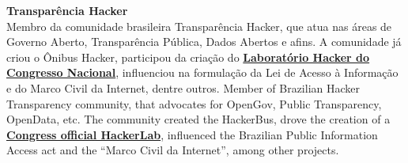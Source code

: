 \documentclass[]{friggeri-cv}
\begin{document}
\textbf{Transparência Hacker }\\
%
{Membro da comunidade brasileira Transparência Hacker, que atua nas áreas de Governo Aberto, Transparência Pública, Dados Abertos e afins. A comunidade já criou o Ônibus Hacker, participou da criação do \href{https://blog.openingparliament.org/post/72099651071/a-permanent-hacker-space-in-the-brazilian-congress}{\textbf{Laboratório Hacker do Congresso Nacional}}, influenciou na formulação da Lei de Acesso à Informação e do Marco Civil da Internet, dentre outros.}%
{Member of Brazilian Hacker Transparency community, that advocates for OpenGov, Public Transparency, OpenData, etc. The community created the HackerBus, drove the creation of a \href{https://blog.openingparliament.org/post/72099651071/a-permanent-hacker-space-in-the-brazilian-congress}{\textbf{Congress official \mbox{HackerLab}}}, influenced the Brazilian Public Information Access act and the ``Marco Civil da Internet'', among other projects.}
%
%
%
%
\end{document}

